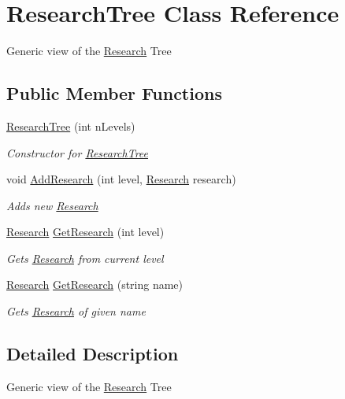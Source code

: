 \hypertarget{class_research_tree}{}\section{Research\+Tree Class Reference}
\label{class_research_tree}


Generic view of the \hyperlink{class_research}{Research} Tree  


\subsection*{Public Member Functions}
\begin{DoxyCompactItemize}
\item 
\hyperlink{class_research_tree_a4ae84dd5e4b68d2fabc87e2c5c15fcaa}{Research\+Tree} (int n\+Levels)
\begin{DoxyCompactList}\small\item\em Constructor for \hyperlink{class_research_tree}{Research\+Tree} \end{DoxyCompactList}\item 
void \hyperlink{class_research_tree_a3cfd010b54ae7bea05ebe91b5d306075}{Add\+Research} (int level, \hyperlink{class_research}{Research} research)
\begin{DoxyCompactList}\small\item\em Adds new \hyperlink{class_research}{Research} \end{DoxyCompactList}\item 
\hyperlink{class_research}{Research} \hyperlink{class_research_tree_a4a8a740f502a4dcbebfa99d5e349fefa}{Get\+Research} (int level)
\begin{DoxyCompactList}\small\item\em Gets \hyperlink{class_research}{Research} from current level \end{DoxyCompactList}\item 
\hyperlink{class_research}{Research} \hyperlink{class_research_tree_ab36353e1ea9422e4ed31f2026d0e46df}{Get\+Research} (string name)
\begin{DoxyCompactList}\small\item\em Gets \hyperlink{class_research}{Research} of given name \end{DoxyCompactList}\end{DoxyCompactItemize}


\subsection{Detailed Description}
Generic view of the \hyperlink{class_research}{Research} Tree 



